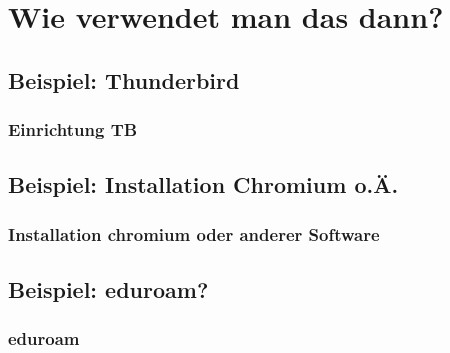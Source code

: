 \documentclass{beamer}
\begin{document}
    \section{Wie verwendet man das dann?}
        \subsection{Beispiel: Thunderbird}
            \begin{frame}
          		\frametitle{Einrichtung TB}
        		\begin{minipage}{0.44\textwidth}
        		
        		\end{minipage}%
        		\begin{minipage}{0.54\textwidth}
        		
        		\end{minipage}
        	\end{frame}
        	
        \subsection{Beispiel: Installation Chromium o.Ä.}
            \begin{frame}
          		\frametitle{Installation chromium oder anderer Software}
        		\begin{minipage}{0.44\textwidth}
        		
        		\end{minipage}%
        		\begin{minipage}{0.54\textwidth}
        		
        		\end{minipage}
        	\end{frame}
        
        \subsection{Beispiel: eduroam?}
            \begin{frame}
          		\frametitle{eduroam}
        		\begin{minipage}{0.44\textwidth}
        		
        		\end{minipage}%
        		\begin{minipage}{0.54\textwidth}
        		
        		\end{minipage}
        	\end{frame}
        	
\end{document}

